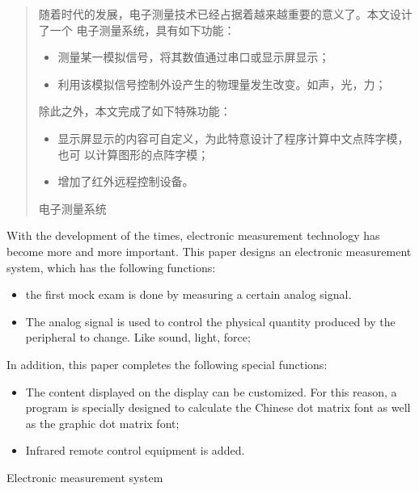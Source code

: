\documentclass[../main]{subfiles}
\begin{document}
\begin{abstract}
  随着时代的发展，电子测量技术已经占据着越来越重要的意义了。本文设计了一个
  电子测量系统，具有如下功能：

  \begin{itemize}
    \item 测量某一模拟信号，将其数值通过串口或显示屏显示；
    \item 利用该模拟信号控制外设产生的物理量发生改变。如声，光，力；
  \end{itemize}

  除此之外，本文完成了如下特殊功能：

  \begin{itemize}
    \item 显示屏显示的内容可自定义，为此特意设计了程序计算中文点阵字模，也可
      以计算图形的点阵字模；
    \item 增加了红外远程控制设备。
  \end{itemize}

  \begin{keyword}
    电子测量系统
  \end{keyword}
\end{abstract}

\begin{abstract*}

  With the development of the times, electronic measurement technology has
  become more and more important. This paper designs an electronic
  measurement system, which has the following functions:

  \begin{itemize}
    \item the first mock exam is done by measuring a certain analog signal.
    \item The analog signal is used to control the physical quantity produced
      by the peripheral to change. Like sound, light, force;
  \end{itemize}

  In addition, this paper completes the following special functions:

  \begin{itemize}
    \item The content displayed on the display can be customized. For this
      reason, a program is specially designed to calculate the Chinese dot
      matrix font as well as the graphic dot matrix font;
    \item Infrared remote control equipment is added.
  \end{itemize}

  \begin{keyword*}
    Electronic measurement system
  \end{keyword*}
\end{abstract*}
\end{document}
